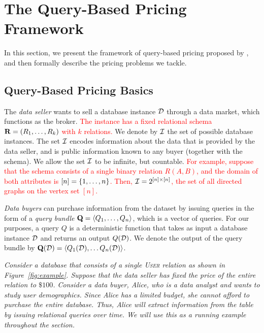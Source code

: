 \section{The Query-Based Pricing Framework}
\label{sec:framework}

In this section, we present the framework of query-based pricing proposed by \cite{deep2016design} , and then formally describe the pricing problems we tackle.

\subsection{Query-Based Pricing Basics}

The {\em data seller} wants to sell a database instance $\mathcal{D}$ through a data market, which functions as the broker. \textcolor{red}{The instance has a fixed relational schema $\mathbf{R} = (R_1, \dots, R_k)$ with $k$ relations.} We denote by $\mathcal{I}$ the set of possible database instances. The set $\mathcal{I}$ encodes information about the data that is provided by the data seller, and is public information known to any buyer (together with the schema). We allow the set $\mathcal{I}$ to be infinite, but countable. \textcolor{red}{For example, suppose that the schema consists of a single binary relation $R(A,B)$, and the domain of both attributes is $[n] = \{1, \dots, n\}$. Then, $\mathcal{I} = 2^{[n] \times [n]}$, \ie the set of all directed graphs on the vertex set $[n]$.}

{\em Data buyers} can purchase information from the dataset by issuing queries in the form of a {\em query bundle}  $\mathbf{Q}=\langle {Q_1, \hdots, Q_n} \rangle$, which is a vector of queries. For our purposes, a query $Q$ is a deterministic function that takes as input a database instance $\mathcal{D}$ and returns an output $Q(\mathcal{D})$. We denote the output of the query bundle by $\mathbf{Q}(\mathcal{D}) = \langle {Q_1(\mathcal{D}), \hdots Q_n(\mathcal{D})} \rangle$. 

\begin{example}
	\textit{Consider a database that consists of a single \textsc{User} relation as shown in Figure~\ref{fig:example}. Suppose that the data seller has fixed the price of the entire relation to $\$100$. Consider a data buyer, Alice, who is a data analyst and wants to study user demographics. Since Alice has a limited budget, she cannot afford to purchase the entire database. Thus, Alice will extract information from the table by issuing relational queries over time. We will use this as a running example throughout the section.}
\end{example}

